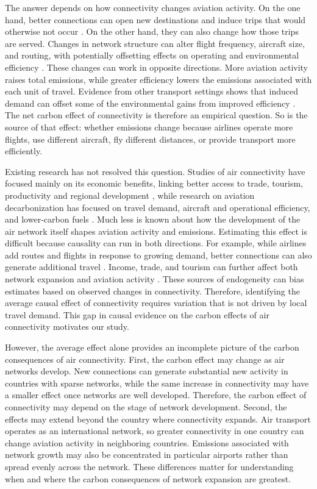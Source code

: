 \documentclass[12pt]{extarticle}
\begin{document}
The answer depends on how connectivity changes aviation activity. On the
one hand, better connections can open new destinations and induce trips
that would otherwise not occur \citep{koo2017,piermartini2013}. On the
other hand, they can also change how those trips are served. Changes in
network structure can alter flight frequency, aircraft size, and routing,
with potentially offsetting effects on operating and environmental
efficiency \citep{brueckner2004,pels2021}. These changes can work in
opposite directions. More aviation activity raises total emissions, while
greater efficiency lowers the emissions associated with each unit of
travel. Evidence from other transport settings shows that induced demand
can offset some of the environmental gains from improved efficiency
\citep{hymel2010,ou2024}. The net carbon effect of connectivity is
therefore an empirical question. So is the source of that effect: whether
emissions change because airlines operate more flights, use different
aircraft, fly different distances, or provide transport more efficiently.

Existing research has not resolved this question. Studies of air
connectivity have focused mainly on its economic benefits, linking better
access to trade, tourism, productivity and regional development
\citep{lenaerts2021,zhang2020}, while research on aviation
decarbonization has focused on travel demand, aircraft and operational
efficiency, and lower-carbon fuels \citep{bergero2023,dray2022}. Much
less is known about how the development of the air network itself shapes
aviation activity and emissions. Estimating this effect is difficult
because causality can run in both directions. For example, while airlines
add routes and flights in response to growing demand, better connections
can also generate additional travel \citep{koo2017,pitfield2010}. Income,
trade, and tourism can further affect both network expansion and aviation
activity \citep{vandevijver2014}. These sources of endogeneity can bias
estimates based on observed changes in connectivity. Therefore,
identifying the average causal effect of connectivity requires variation
that is not driven by local travel demand. This gap in causal evidence on
the carbon effects of air connectivity motivates our study.

However, the average effect alone provides an incomplete picture of the
carbon consequences of air connectivity. First, the carbon effect may
change as air networks develop. New connections can generate substantial
new activity in countries with sparse networks, while the same increase in
connectivity may have a smaller effect once networks are well developed.
Therefore, the carbon effect of connectivity may depend on the stage of
network development. Second, the effects may extend beyond the country
where connectivity expands. Air transport operates as an international
network, so greater connectivity in one country can change aviation
activity in neighboring countries. Emissions associated with network
growth may also be concentrated in particular airports rather than spread
evenly across the network. These differences matter for understanding
when and where the carbon consequences of network expansion are greatest.
\end{document}
